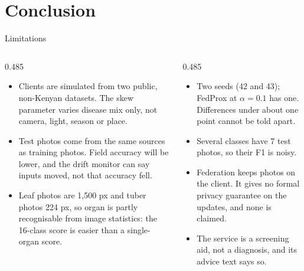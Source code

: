 \documentclass[11pt, aspectratio=169]{beamer}
\begin{document}
\section{Conclusion}
\begin{frame}[t]{Limitations}
  \body
  \begin{columns}[T]
    \begin{column}{0.485\textwidth}
      \begin{itemize}\setlength\itemsep{0.25em}
        \item Clients are simulated from two public, non-Kenyan datasets. The skew parameter varies disease mix only, not camera, light, season or place.
        \item Test photos come from the same sources as training photos. Field accuracy will be lower, and the drift monitor can say inputs moved, not that accuracy fell.
        \item Leaf photos are 1,500 px and tuber photos 224 px, so organ is partly recognisable from image statistics: the 16-class score is easier than a single-organ score.
      \end{itemize}
    \end{column}
    \begin{column}{0.485\textwidth}
      \begin{itemize}\setlength\itemsep{0.25em}
        \item Two seeds (42 and 43); FedProx at $\alpha=0.1$ has one. Differences under about one point cannot be told apart.
        \item Several classes have 7 test photos, so their F1 is noisy.
        \item Federation keeps photos on the client. It gives no formal privacy guarantee on the updates, and none is claimed.
        \item The service is a screening aid, not a diagnosis, and its advice text says so.
      \end{itemize}
    \end{column}
  \end{columns}
\end{frame}
\end{document}
